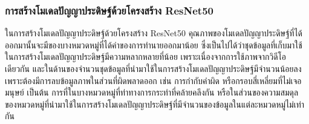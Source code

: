 \subsubsection{การสร้างโมเดลปัญญาประดิษฐ์ด้วยโครงสร้าง ResNet50}
\par
ในการสร้างโมเดลปัญญาประดิษฐ์ด้วยโครงสร้าง ResNet50 คุณภาพของโมเดลปัญญาประดิษฐ์ที่ได้ออกมานั้นจะมีของบางหมวดหมู่ที่ได้ค่าของการทำนายออกมาน้อย ซึ่งเป็นไปได้ว่าชุดข้อมูลที่เก็บมาใช้ในการสร้างโมเดลปัญญาประดิษฐ์มีความหลากหลายที่น้อย เพราะเนื่องจากการใช้ภาพจากวิดีโอเดียวกัน และในด้านของจำนวนชุดข้อมูลที่นำมาใช้ในการสร้างโมเดลปัญญาประดิษฐ์มีจำนวนน้อยลง เพราะต้องมีการลบข้อมูลภาพในส่วนที่ผิดพลาดออก เช่น การกำกับคำผิด หรือกรอบสี่เหลี่ยมที่ไม่เจอมนุษย์ เป็นต้น การที่ในบางหมวดหมู่ที่ท่าทางการกระทำที่คล้ายคลึงกัน หรือในส่วนของความสมดุลของหมวดหมู่ที่นำมาใช้ในการสร้างโมเดลปัญญาประดิษฐ์ที่มีจำนวนของข้อมูลในแต่ละหมวดหมู่ไม่เท่ากัน
